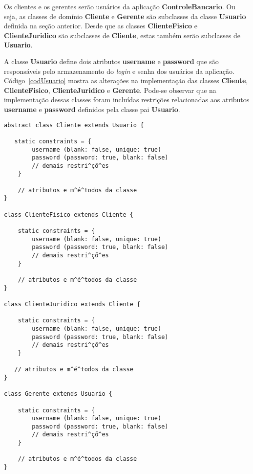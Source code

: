 Os    clientes   e   os    gerentes   serão    usuários   da    aplicação   {\bf
  ControleBancario}.  Ou  seja, as  classes  de  domínio  {\bf Cliente}  e  {\bf
  Gerente}   são  subclasses  da   classe  {\bf   Usuario}  definida   na  seção
anterior. Desde que  as classes {\bf ClienteFisico} e  {\bf ClienteJuridico} são
subclasses de {\bf Cliente}, estas também serão subclasses de {\bf Usuario}.

\vspace{0.2cm}

A classe {\bf Usuario} define dois atributos {\bf username} e {\bf password} que
são  responsáveis pelo  armazenamento do  {\it login}  e senha  dos  usuários da
aplicação.   Código~\ref{codUsuario}  mostra   as  alterações  na  implementação
das  classes {\bf Cliente},  {\bf ClienteFisico},  {\bf ClienteJuridico}  e {\bf
  Gerente}.   Pode-se  observar  que   na  implementação  dessas  classes  foram
incluídas  restrições   relacionadas  aos   atributos  {\bf  username}   e  {\bf
  password} definidos pela classe pai {\bf Usuario}. 

\begin{lstlisting}[caption=Usuários:   Clientes  e   Gerentes,  frame   =  trBL,
    float=htbp, label=codUsuario] 
abstract class Cliente extends Usuario {  
 
   static constraints = {
        username (blank: false, unique: true)
        password (password: true, blank: false)
        // demais restri^çõ^es
    }

    // atributos e m^é^todos da classe
}

class ClienteFisico extends Cliente {
    
    static constraints = {
        username (blank: false, unique: true)
        password (password: true, blank: false)
        // demais restri^çõ^es
    }
    
    // atributos e m^é^todos da classe
}

class ClienteJuridico extends Cliente {
    
    static constraints = {
        username (blank: false, unique: true)
        password (password: true, blank: false)
        // demais restri^çõ^es
    }
    
   // atributos e m^é^todos da classe
}

class Gerente extends Usuario {

    static constraints = {
        username (blank: false, unique: true)
        password (password: true, blank: false)
        // demais restri^çõ^es
    }
   
    // atributos e m^é^todos da classe
}
\end{lstlisting}

